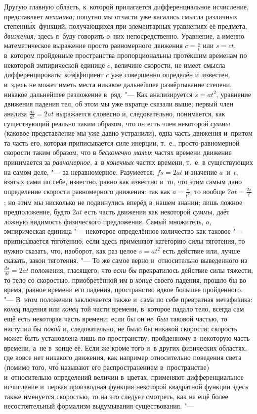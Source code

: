Другую главную область, к~которой прилагается дифференциальное исчисление,
представляет {\em механика;} попутно мы отчасти уже касались смысла различных
степенн\'{ы}х~функций, получающихся при элементарных уравнениях её предмета,
{\em движения;} здесь я~буду говорить о~них непосредственно. Уравнение, а
именно математическое выражение просто равномерного движения $c=\frac s t$ или
$s=ct$, в~котором пройденные пространства пропорциональны протёкшим временам по
некоторой эмпирической единице $c$, величине скорости, не имеет смысла
дифференцировать; коэффициент $c$ уже совершенно определён и~известен, и~здесь не
может иметь места никакое дальнейшее развёртывание степени, никакое дальнейшее
разложение в~ряд. "--- Как анализируется $s=at^2$, уравнение движения падения
тел, об этом мы уже вкратце сказали выше; первый член анализа
$\frac{ds}{dt}=2at$ выражается словесно и, следовательно, понимается, как
существующий реально таким образом, что он есть член некоторой {\em суммы}
(каковое представление мы уже давно устранили), одна часть движения и~притом та
часть его, которая приписывается силе инерции, т.~е., просто-равномерной
скорости таким образом, что в {\em бесконечно малых} частях времени движение
принимается за {\em равномерное,} а~в {\em конечных} частях времени, т.~е. в
существующих на самом деле, "--- за неравномерное. Разумеется, $fs=2at$ и
значение $a$~и~$t$, взятых сами по себе, известно, равно как известно и~то, что
этим самым дано определение скорости равномерного движения: так как $a=\frac
s{t^2}$, то вообще $2at=\frac{2s} t$; но этим мы нисколько не подвинулись
вперёд в~нашем знании; лишь ложное предположение, будто $2at$ есть часть
движения как некоторой {\em суммы,} даёт ложную видимость физического
предложения. Самый множитель, $a$, эмпирическая единица "--- некоторое
определённое количество как таковое "--- приписывается тяготению; если здесь
применяют категорию силы тяготения, то нужно сказать, что, наоборот, как раз
целое $s=at^2$ есть действие или, лучше сказать, закон тяготения. "--- То же
самое верно и~относительно выведенного из $\frac{ds}{dt}=2at$ положения,
гласящего, что {\em если бы} прекратилось действие силы тяжести, то тело со
скоростью, приобретённой им в {\em конце} своего падения, прошло бы во время,
равное времени его падения, пространство вдвое большее пройденного. "--- В~этом
положении заключается также и~сама по себе превратная метафизика: {\em конец}
падения или {\em конец} той части времени, в~которое падало тело, всегда сам
ещё есть некоторая часть времени; если бы он {\em не~был} таковой частью, то
наступил бы {\em покой} и, следовательно, не было бы никакой скорости; скорость
может быть установлена лишь по пространству, пройденному в~некоторую часть
времени, а~не в~конце её. Если же кроме того и~в других физических областях,
где вовсе нет никакого движения, как например относительно поведения света
(помимо того, чт\'{о} называют его распространением в~пространстве) и~относительно
определений величин в~цветах, применяют дифференциальное исчисление и~первая
производная функция некоторой квадратной функции здесь также именуется
скоростью, то на это следует смотреть, как на ещё более несостоятельный
формализм выдумывания существования. "---

